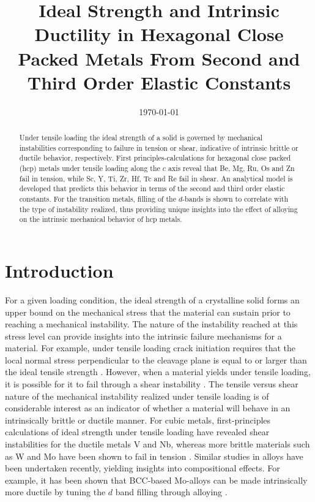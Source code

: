 \documentclass[showpacs,aps,floatfix,prb,reprint,superscriptaddress]{revtex4-1}
\begin{document}
\title{\Large Ideal Strength and Intrinsic Ductility in Hexagonal Close Packed Metals From Second and Third Order Elastic Constants}


\date{\today}

\begin{abstract}
Under tensile loading the ideal strength of a solid is governed by mechanical instabilities corresponding to failure in tension or shear, indicative of intrinsic brittle or ductile behavior, respectively.  First principles-calculations for hexagonal close packed (hcp) metals under tensile loading along the $c$ axis reveal that Be, Mg, Ru, Os and Zn fail in tension, while Sc, Y, Ti, Zr, Hf, Tc and Re fail in shear. An analytical model is developed that predicts this behavior in terms of the second and third order elastic constants. For the transition metals, filling of the $d$-bands is shown to correlate with the type of instability realized, thus providing unique insights into the effect of alloying on the intrinsic mechanical behavior of hcp metals.
\end{abstract}

\maketitle

\section{Introduction}
For a given loading condition, the ideal strength of a crystalline solid forms an upper bound on the mechanical stress that the material can sustain prior to reaching a mechanical instability. The nature of the instability reached at this stress level can provide insights into the intrinsic failure mechanisms for a material.  For example, under tensile loading crack initiation requires that the local normal stress perpendicular to the cleavage plane is equal to or larger than the ideal tensile strength \cite{li2007ideal,clatterbuck2003ideal,kelly1986strong,wang2013estimate}.  However, when a material yields under tensile loading, it is possible for it to fail through a shear instability \cite{PhysRevLett.91.135501,PhysRevLett.112.115503,macmillan1983ideal,roundy2001ideal,wang2009elastic}. The tensile versus shear nature of the mechanical instability realized under tensile loading is of considerable interest as an indicator of whether a material will behave in an intrinsically brittle or ductile manner. For cubic metals, first-principles calculations of ideal strength under tensile loading have revealed shear instabilities for the ductile metals V and Nb, whereas more brittle materials such as W and Mo have been shown to fail in tension \cite{PhysRevLett.112.115503}. Similar studies in alloys \cite{PhysRevLett.82.2713,PhysRevB.87.214203,vsob1997theoretical,PhysRevB.58.6006} have been undertaken recently, yielding insights into compositional effects. For example, it has been shown that BCC-based Mo-alloys can be made intrinsically more ductile by tuning the $d$ band filling through alloying \cite{PhysRevLett.112.115503}.
\end{document}
